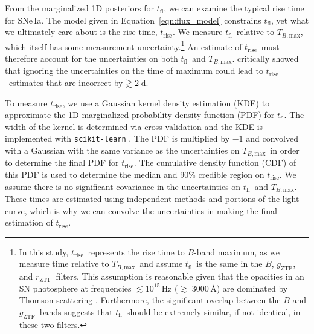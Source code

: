 \documentclass[twocolumn]{./aastex63}
\newcommand{\rztf}{$r_\mathrm{ZTF}$}
\newcommand{\gztf}{$g_\mathrm{ZTF}$}
\newcommand{\tfl}{$t_\mathrm{fl}$}
\newcommand{\trise}{$t_\mathrm{rise}$}
\newcommand{\tbmax}{$T_{B,\mathrm{max}}$}
\begin{document}
From the marginalized 1D posteriors for \tfl, we can examine the typical rise
time for SNe\,Ia. The model given in Equation~\ref{eqn:flux_model} constrains
\tfl, yet what we ultimately care about is the rise time, \trise. We measure
\tfl\ relative to \tbmax, which itself has some measurement
uncertainty.\footnote{In this study, \trise\ represents the rise time to
$B$-band maximum, as we measure time relative to \tbmax\ and assume \tfl\ is
the same in the $B$, \gztf, and \rztf\ filters. This assumption is
reasonable given that the opacities in an SN photosphere at frequencies
$\lesssim 10^{15}$\,Hz ($\gtrsim$ 3000\,\AA) are dominated by Thomson
scattering \citep[see Figure~6 in][]{Magee18}. Furthermore, the significant
overlap between the $B$ and \gztf\ bands suggests that \tfl\ should be
extremely similar, if not identical, in these two filters.} An estimate of
\trise\ must therefore account for the uncertainties on both \tfl\ and \tbmax.
\citet{Aldering00} critically showed that ignoring the uncertainties on the
time of maximum could lead to \trise\ estimates that are incorrect by $\gtrsim
2$\,d.

To measure \trise, we use a Gaussian kernel density estimation (KDE) to
approximate the 1D marginalized probability density function (PDF) for \tfl.
The width of the kernel is determined via cross-validation and the KDE is
implemented with \texttt{scikit-learn} \citep{Pedregosa11}. The PDF is
multiplied by $-1$ and convolved with a Gaussian with the same variance as the
uncertainties on \tbmax\ in order to determine the final PDF for \trise. The
cumulative density function (CDF) of this PDF is used to determine the median
and 90\% credible region on \trise. We assume there is no significant
covariance in the uncertainties on \tfl\ and \tbmax. These times are estimated
using independent methods and portions of the light curve, which is why we can
convolve the uncertainties in making the final estimation of \trise.
\end{document}
